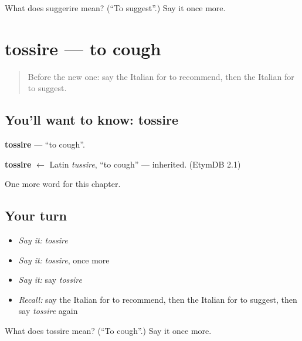 \begin{tcolorbox}[breakable,colback=teal!4,colframe=teal!35!black,title={Before you move on}]
What does suggerire mean? (\textquotedblleft{}To suggest\textquotedblright{}.) Say it once more.
\end{tcolorbox}
\section[tossire]{tossire — to cough}

\label{lesson:IT-C214-tossire}



\begin{quote}
Before the new one: say the Italian for to recommend, then the Italian for to suggest.
\end{quote}

\subsection*{You'll want to know: tossire}
\textbf{tossire} — \textquotedblleft{}to cough\textquotedblright{}.

\begin{cousinweb}
\textbf{tossire} $\leftarrow$ Latin \emph{tussire}, \textquotedblleft{}to cough\textquotedblright{} — inherited. (EtymDB 2.1)
\end{cousinweb}

\begin{grammarlens}[title={What you've built}]
One more word for this chapter.
\end{grammarlens}

\subsection*{Your turn}
\begin{itemize}
\raggedright
  \item \emph{Say it:} \emph{tossire}
  \item \emph{Say it:} \emph{tossire}, once more
  \item \emph{Say it:} say \emph{tossire}
  \item \emph{Recall:} say the Italian for to recommend, then the Italian for to suggest, then say \emph{tossire} again
\end{itemize}

\begin{tcolorbox}[breakable,colback=teal!4,colframe=teal!35!black,title={Before you move on}]
What does tossire mean? (\textquotedblleft{}To cough\textquotedblright{}.) Say it once more.
\end{tcolorbox}

